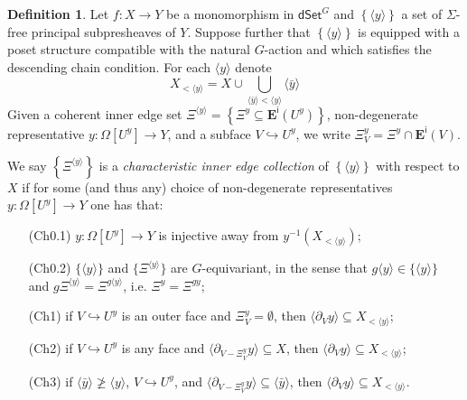 \documentclass[a4paper,10pt
,draft
]{article}%
\numberwithin{equation}{section}
\numberwithin{figure}{section}
\theoremstyle{definition} %
\newtheorem{definition}[equation]{Definition}%
\newcommand{\1}{\ensuremath{\mathbbm 1}}%
\begin{document}
\begin{definition}\label{CHAREDGE DEF}
	Let $f\colon X \to Y$ be a monomorphism in 
	$\mathsf{dSet}^G$ and 
	$\left\{ \langle y \rangle\right\}$
	a set of $\Sigma$-free principal subpresheaves of $Y$. 
	Suppose further that 
	$\left\{ \langle y \rangle \right\}$ is equipped 
	with a poset structure compatible with the natural $G$-action
	and which satisfies the descending chain condition.
	For each $\langle y \rangle$ denote
	\[
	X_{< \langle y \rangle} = X \cup 
	\bigcup_{\langle\bar{y}\rangle < \langle y \rangle} \langle \bar{y} \rangle
	\]
	Given a coherent inner edge set 
	$
	\Xi^{\langle y \rangle} =
	\left\{ \Xi^y \subseteq \boldsymbol{E}^{\mathsf{i}}(U^y)\right\}$,
	non-degenerate representative
	$y \colon \Omega[U^y] \to Y$, and a subface $V \hookrightarrow U^y$,
	we write
	$\Xi^y_V = \Xi^y \cap \boldsymbol{E}^{\mathsf{i}}(V)$.
	
	We say
	$
	\left\{ \Xi^{\langle y \rangle} \right \} 
	$
	is a \emph{characteristic inner edge collection} 
	of $\left\{ \langle y \rangle \right\}$ with respect to $X$ if
	for some (and thus any) choice of non-degenerate representatives
	$y\colon \Omega[U^y] \to Y$ one has that:
	\begin{enumerate}
		\item[(Ch0.1)] $y \colon \Omega[U^y] \to Y$ is injective away from
		$y^{-1}\left( X_{< \langle y \rangle} \right)$; 
		\item[(Ch0.2)]
		$\{\langle y\rangle\}$ and
		$\{\Xi^{\langle y \rangle}\}$ are $G$-equivariant, in the sense that
		$g\langle y\rangle \in \{\langle y\rangle\}$ and 
		$g \Xi^{\langle y \rangle} =
		\Xi^{g \langle y \rangle}$,
		i.e. $\Xi^y = \Xi^{gy}$;
		\item[(Ch1)] if $V \hookrightarrow U^y$ is an outer face and $\Xi^y_V = \emptyset$,
		then $\langle \partial_V y \rangle \subseteq X_{< \langle y \rangle}$;
		\item[(Ch2)] if $V \hookrightarrow U^y$ is any face and
		$\langle \partial_{V-\Xi^y_V} y\rangle \subseteq X$,
		then
		$\langle \partial_V y\rangle \subseteq X_{< \langle y \rangle}$;
		\item[(Ch3)] if $\langle \bar{y} \rangle \not \geq \langle y \rangle$,
		$V \hookrightarrow U^y$,
		and
		$\langle \partial_{V-\Xi^y_V} y\rangle \subseteq \langle \bar{y} \rangle$,
		then
		$\langle \partial_V y\rangle \subseteq X_{< \langle y \rangle}$.
	\end{enumerate}
\end{definition}
\end{document}
